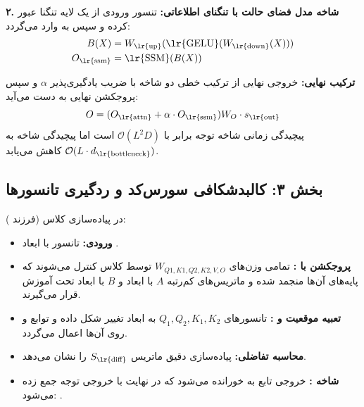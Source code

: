 \textbf{۲. شاخه مدل فضای حالت با تنگنای اطلاعاتی:}
تنسور ورودی از یک لایه تنگنا  عبور کرده و سپس به  وارد می‌گردد:
\begin{align}
    B(X) &= W_{\text{\lr{up}}}(\text{\lr{GELU}}(W_{\text{\lr{down}}}(X))) \\
    O_{\text{\lr{ssm}}} &= \text{\lr{SSM}}(B(X))
\end{align}

\textbf{ترکیب نهایی:}
خروجی نهایی از ترکیب خطی دو شاخه با ضریب یادگیری‌پذیر $\alpha$ و سپس پروجکشن نهایی به دست می‌آید:
\begin{equation}
    O = (O_{\text{\lr{attn}}} + \alpha \cdot O_{\text{\lr{ssm}}}) W_O \cdot s_{\text{\lr{out}}}
\end{equation}
پیچیدگی زمانی شاخه توجه برابر با $\mathcal{O}(L^2 D)$ است اما پیچیدگی شاخه  به $\mathcal{O}(L \cdot d_{\text{\lr{bottleneck}}})$ کاهش می‌یابد.

\subsection*{بخش ۳: کالبدشکافی سورس‌کد و ردگیری تانسورها }
در پیاده‌سازی کلاس  (فرزند ):
\begin{itemize}
    \item \textbf{ورودی:} تانسور  با ابعاد \lr{[B, L, D]}.
    \item \textbf{پروجکشن با :} تمامی وزن‌های $W_{Q1, K1, Q2, K2, V, O}$ توسط کلاس  کنترل می‌شوند که پایه‌های آن‌ها  منجمد شده و ماتریس‌های کم‌رتبه $A$ با ابعاد \lr{[r, D]} و $B$ با ابعاد \lr{[D, r]} تحت آموزش قرار می‌گیرند.
    \item \textbf{تعبیه موقعیت و :} تانسورهای $Q_1, Q_2, K_1, K_2$ به ابعاد \lr{[B, H, L, d]} تغییر شکل داده و توابع   و  روی آن‌ها اعمال می‌گردد.
    \item \textbf{محاسبه تفاضلی:}  پیاده‌سازی دقیق ماتریس $S_{\text{\lr{diff}}}$ را نشان می‌دهد.
    \item \textbf{شاخه :} خروجی تابع  به  خورانده می‌شود که در نهایت با خروجی توجه جمع زده می‌شود: .
\end{itemize}

